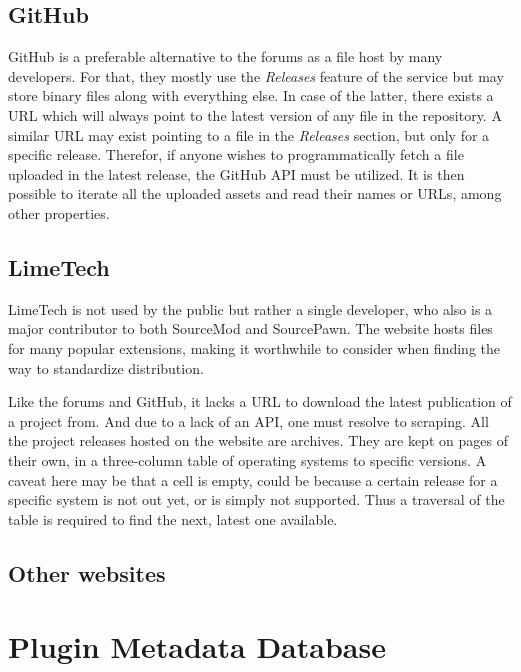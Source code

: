 \subsection{GitHub}

GitHub is a preferable alternative to the forums as a file host by many developers.
For that, they mostly use the \textit{Releases} feature of the service but may store binary files along with everything else.
In case of the latter, there exists a URL which will always point to the latest version of any file in the repository.
A similar URL may exist pointing to a file in the \textit{Releases} section, but only for a specific release.
Therefor, if anyone wishes to programmatically fetch a file uploaded in the latest release, the GitHub API must be utilized.
It is then possible to iterate all the uploaded assets and read their names or URLs, among other properties.

\subsection{LimeTech}

LimeTech is not used by the public but rather a single developer, who also is a major contributor to both SourceMod and SourcePawn.
The website hosts files for many popular extensions, making it worthwhile to consider when finding the way to standardize distribution.

Like the forums and GitHub, it lacks a URL to download the latest publication of a project from.
And due to a lack of an API, one must resolve to scraping.
All the project releases hosted on the website are archives.
They are kept on pages of their own, in a three-column table of operating systems to specific versions.
A caveat here may be that a cell is empty, could be because a certain release for a specific system is not out yet, or is simply not supported.
Thus a traversal of the table is required to find the next, latest one available.

\subsection{Other websites}

\section{Plugin Metadata Database}
